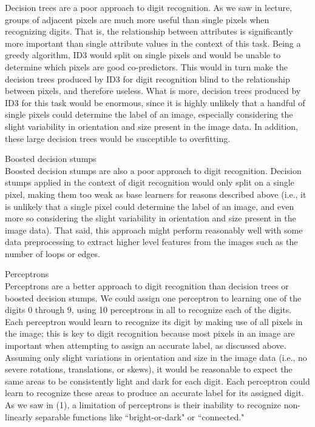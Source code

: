 \documentclass[solution, letterpaper]{cs121}
\begin{document}
Decision trees are a poor approach to digit recognition. As we saw in lecture, groups of adjacent pixels are much more useful than single pixels when recognizing digits. That is, the relationship between attributes is significantly more important than single attribute values in the context of this task. Being a greedy algorithm, ID3 would split on single pixels and would be unable to determine which pixels are good co-predictors. This would in turn make the decision trees produced by ID3 for digit recognition blind to the relationship between pixels, and therefore useless. What is more, decision trees produced by ID3 for this task would be enormous, since it is highly unlikely that a handful of single pixels could determine the label of an image, especially considering the slight variability in orientation and size present in the image data. In addition, these large decision trees would be susceptible to overfitting.

\subproblem Boosted decision stumps \\

Boosted decision stumps are also a poor approach to digit recognition. Decision stumps applied in the context of digit recognition would only split on a single pixel, making them too weak as base learners for reasons described above (i.e., it is unlikely that a single pixel could determine the label of an image, and even more so considering the slight variability in orientation and size present in the image data). That said, this approach might perform reasonably well with some data preprocessing to extract higher level features from the images such as the number of loops or edges.

\subproblem Perceptrons \\

Perceptrons are a better approach to digit recognition than decision trees or boosted decision stumps. We could assign one perceptron to learning one of the digits $0$ through $9$, using 10 perceptrons in all to recognize each of the digits. Each perceptron would learn to recognize its digit by making use of all pixels in the image; this is key to digit recognition because most pixels in an image are important when attempting to assign an accurate label, as discussed above. Assuming only slight variations in orientation and size in the image data (i.e., no severe rotations, translations, or skews), it would be reasonable to expect the same areas to be consistently light and dark for each digit. Each perceptron could learn to recognize these areas to produce an accurate label for its assigned digit. As we saw in (1), a limitation of perceptrons is their inability to recognize non-linearly separable functions like ``bright-or-dark" or ``connected."
\end{document}

